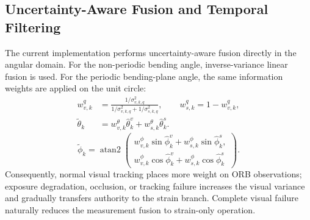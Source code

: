 \documentclass[journal,twoside]{IEEEtran}
\begin{document}
\subsection{Uncertainty-Aware Fusion and Temporal Filtering}
The current implementation performs uncertainty-aware fusion directly in the angular domain. For the non-periodic bending angle, inverse-variance linear fusion is used. For the periodic bending-plane angle, the same information weights are applied on the unit circle:
\begin{equation}
\begin{aligned}
w_{v,k}^{q}&=\frac{1/\sigma_{v,k,q}^{2}}
{1/\sigma_{v,k,q}^{2}+1/\sigma_{s,k,q}^{2}},
\qquad w_{s,k}^{q}=1-w_{v,k}^{q},\\
\tilde\theta_k&=w_{v,k}^{\theta}\hat\theta_k^v
+w_{s,k}^{\theta}\hat\theta_k^s.
\end{aligned}
\label{eq:fusion_theta}
\end{equation}
\begin{equation}
\tilde\phi_k=\operatorname{atan2}\!\left(
\begin{array}{l}
w_{v,k}^{\phi}\sin\hat\phi_k^v+w_{s,k}^{\phi}\sin\hat\phi_k^s,\\
w_{v,k}^{\phi}\cos\hat\phi_k^v+w_{s,k}^{\phi}\cos\hat\phi_k^s
\end{array}\right).
\label{eq:fusion_phi}
\end{equation}
Consequently, normal visual tracking places more weight on ORB observations; exposure degradation, occlusion, or tracking failure increases the visual variance and gradually transfers authority to the strain branch. Complete visual failure naturally reduces the measurement fusion to strain-only operation.
\end{document}
